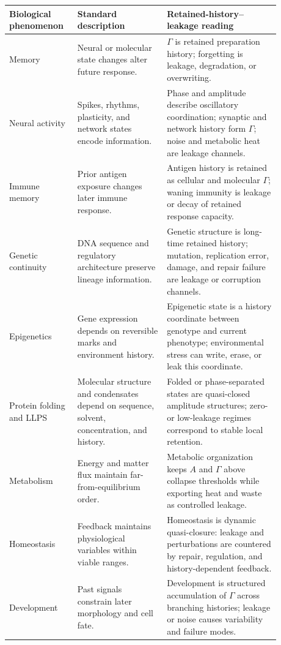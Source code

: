 \documentclass[11pt,a4paper]{article}
\newcommand{\Ghist}{\Gamma}
\begin{document}
\begin{center}
\small
\begin{tabular}{L{0.20\linewidth}L{0.30\linewidth}L{0.38\linewidth}}
\toprule
Biological phenomenon & Standard description & Retained-history--leakage reading \\
\midrule
Memory & Neural or molecular state changes alter future response. & \(\Ghist\) is retained preparation history; forgetting is leakage, degradation, or overwriting. \\
Neural activity & Spikes, rhythms, plasticity, and network states encode information. & Phase and amplitude describe oscillatory coordination; synaptic and network history form \(\Ghist\); noise and metabolic heat are leakage channels. \\
Immune memory & Prior antigen exposure changes later immune response. & Antigen history is retained as cellular and molecular \(\Ghist\); waning immunity is leakage or decay of retained response capacity. \\
Genetic continuity & DNA sequence and regulatory architecture preserve lineage information. & Genetic structure is long-time retained history; mutation, replication error, damage, and repair failure are leakage or corruption channels. \\
Epigenetics & Gene expression depends on reversible marks and environment history. & Epigenetic state is a history coordinate between genotype and current phenotype; environmental stress can write, erase, or leak this coordinate. \\
Protein folding and LLPS & Molecular structure and condensates depend on sequence, solvent, concentration, and history. & Folded or phase-separated states are quasi-closed amplitude structures; zero- or low-leakage regimes correspond to stable local retention. \\
Metabolism & Energy and matter flux maintain far-from-equilibrium order. & Metabolic organization keeps \(A\) and \(\Ghist\) above collapse thresholds while exporting heat and waste as controlled leakage. \\
Homeostasis & Feedback maintains physiological variables within viable ranges. & Homeostasis is dynamic quasi-closure: leakage and perturbations are countered by repair, regulation, and history-dependent feedback. \\
Development & Past signals constrain later morphology and cell fate. & Development is structured accumulation of \(\Ghist\) across branching histories; leakage or noise causes variability and failure modes. \\

\end{tabular}
\end{center}
\end{document}
